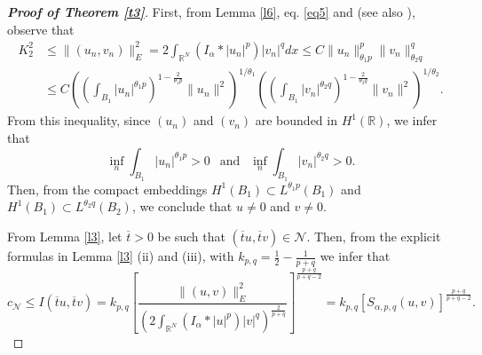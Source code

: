 \documentclass[12pt,a4paper]{article}
\numberwithin{equation}{section}
\begin{document}
\begin{proof}[\bf{Proof of Theorem \ref{t3}}]
First, from Lemma \ref{l6}, eq. \eqref{eq5} and \cite[Lemma 2.3]{Moroz2013} (see also \cite[Lemma I.1]{Lions1985II}), observe that
\begin{align*}
   K^2_2 &\leq \|(u_{n}, v_{n})\|_{E}^{2} = 2 \int_{\mathbb{R}^N} (I_\alpha \ast |u_{n}|^p)|v_{n}|^q dx \leq C \|u_n\|_{\theta_1 p}^{p}\|v_n\|_{\theta_2 q}^{q}\\ & \leq  C \left( \left(\int_{B_1} |u_n|^{\theta_1p}\right)^{1- \frac{2}{\theta_1p}} \|u_n\|^2\right)^{1/\theta_1}\left( \left(\int_{B_1} |v_n|^{\theta_2q}\right)^{1- \frac{2}{\theta_2q}} \|v_n\|^2\right)^{1/\theta_2}.
\end{align*}
From this inequality, since $(u_n)$ and $(v_n)$ are bounded in $H^1(\mathbb{R})$, we infer that 
\[
\inf_n \int_{B_1}|u_n|^{\theta_1p} >0 \ \ \text{ and } \ \ \inf_n \int_{B_1}|v_n|^{\theta_2q} >0.
\]
Then, from the compact embeddings $H^1(B_1) \subset L^{\theta_1p}(B_1)$ and $H^1(B_1) \subset L^{\theta_2q}(B_2)$, we conclude that $u \neq 0$ and $v \neq 0$.
\medbreak

From Lemma \ref{l3}, let $\overline{t}>0$ be such that $(\overline{t}u, \overline{t}v) \in \mathcal{N}$. Then, from the explicit formulas in Lemma \ref{l3} (ii) and (iii), with $k_{p,q} = \frac{1}{2} - \frac{1}{p+q}$ we infer that
\[
c_{\mathcal{N}}  \leq I(\overline{t}u, \overline{t}v) = k_{p,q} \left[ \frac{\|(u,v)\|_E^2}{\left(2\int_{\mathbb{R}^N} (I_{\alpha} \ast |u|^p)|v|^q \right)^{\frac{2}{p+q}}}\right]^{\frac{p+q}{p+q-2}} = k_{p,q} \left[S_{\alpha, p,q}(u,v)\right]^{\frac{p+q}{p+q-2}}.
\]


\end{proof}
\end{document}
